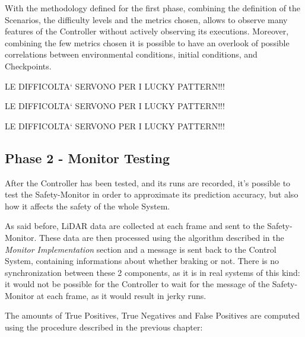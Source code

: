 With the methodology defined for the first phase, combining the definition of the Scenarios, the difficulty levels and the metrics chosen, allows to observe many features of the Controller without actively observing its executions. Moreover, combining the few metrics chosen it is possible to have an overlook of possible correlations between environmental conditions, initial conditions, and Checkpoints.


LE DIFFICOLTA` SERVONO PER I LUCKY PATTERN!!!


LE DIFFICOLTA` SERVONO PER I LUCKY PATTERN!!!


LE DIFFICOLTA` SERVONO PER I LUCKY PATTERN!!!


\subsection{Phase 2 - Monitor Testing}

After the Controller has been tested, and its runs are recorded, it's possible to test the Safety-Monitor in order to approximate its prediction accuracy, but also how it affects the safety of the whole System.

As said before, LiDAR data are collected at each frame and sent to the Safety-Monitor. These data are then processed using the algorithm described in the \textsl{Monitor Implementation} section and a message is sent back to the Control System, containing informations about whether braking or not. There is no synchronization between these 2 components, as it is in real systems of this kind: it would not be possible for the Controller to wait for the message of the Safety-Monitor at each frame, as it would result in jerky runs.

The amounts of True Positives, True Negatives and False Positives are computed using the procedure described in the previous chapter:

